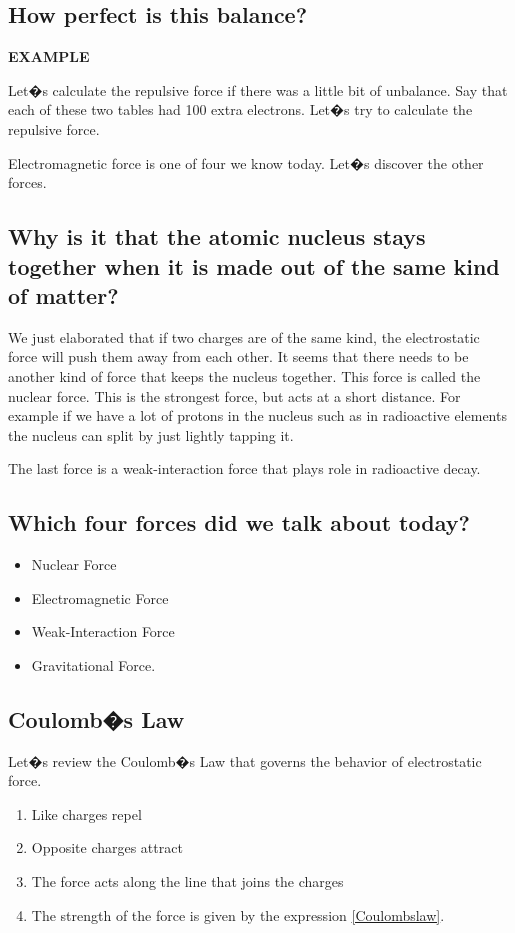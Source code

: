 \subsection{How perfect is this balance?}

{\bf EXAMPLE} 


Let�s calculate the repulsive force if there was a little bit of unbalance. Say that each of these two tables had 100 extra electrons. Let�s try to calculate the repulsive force. 


Electromagnetic force is one of four we know today. Let�s discover the other forces.


\subsection{Why is it that the atomic nucleus stays together when it is made out of the same kind of matter?}


We just elaborated that if two charges are of the same kind, the electrostatic force will push them away from each other. It seems that there needs to be another kind of force that keeps the nucleus together. This force is called the nuclear force. This is the strongest force, but acts at a short distance. For example if we have a lot of protons in the nucleus such as in radioactive elements the nucleus can split by just lightly tapping it. 

The last force is a weak-interaction force that plays role in radioactive decay. 


\subsection{Which four forces did we talk about today?}

\begin{itemize}
\item Nuclear Force
\item Electromagnetic Force
\item Weak-Interaction Force
\item Gravitational Force.
\end{itemize}

\subsection{Coulomb�s Law}

Let�s review the Coulomb�s Law that governs the behavior of electrostatic force.

\begin{enumerate}
\item Like charges repel
\item Opposite charges attract
\item The force acts along the line that joins the charges
\item The strength of the force is given by the expression \ref{Coulombslaw}.
\end{enumerate}





